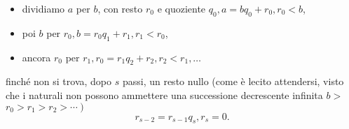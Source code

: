 \begin{enumerate}
          \begin{itemize}

              \item dividiamo $a$ per $b$, con
                    resto $r_0$ e quoziente $q_0, a=b q_0+r_0, r_0<b$,
              \item poi $b$ per $r_0,
                        b=r_0 q_1+r_1, r_1<r_0$,
              \item ancora $r_0$ per $r_1, r_0=r_1 q_2+r_2,
                        r_2<r_1, \ldots$
          \end{itemize}

          finché non si trova, dopo $s$ passi, un resto nullo
          (come è lecito attendersi, visto che i naturali non possono ammettere
          una successione decrescente infinita $b>$
          $\left.r_0>r_1>r_2>\cdots\right)$
          $$
              r_{s-2}=r_{s-1} q_s, r_s=0 .
          $$


\end{enumerate}
